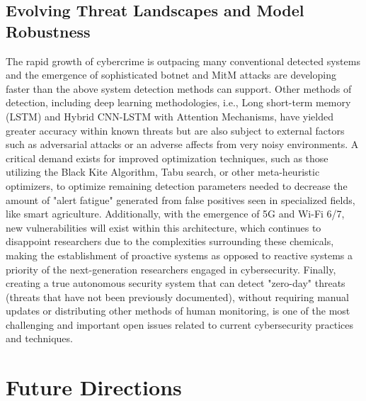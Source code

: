 \documentclass[12pt]{article}
\begin{document}
\subsection{Evolving Threat Landscapes and Model Robustness}
The rapid growth of cybercrime is outpacing many conventional detected systems and the emergence of sophisticated botnet and MitM attacks are developing faster than the above system detection methods can support. Other methods of detection, including deep learning methodologies, i.e., Long short-term memory (LSTM) and Hybrid CNN-LSTM with Attention Mechanisms, have yielded greater accuracy within known threats but are also subject to external factors such as adversarial attacks or an adverse affects from very noisy environments. A critical demand exists for improved optimization techniques, such as those utilizing the Black Kite Algorithm, Tabu search, or other meta-heuristic optimizers, to optimize remaining detection parameters needed to decrease the amount of "alert fatigue" generated from false positives seen in specialized fields, like smart agriculture. Additionally, with the emergence of 5G and Wi-Fi 6/7, new vulnerabilities will exist within this architecture, which continues to disappoint researchers due to the complexities surrounding these chemicals, making the establishment of proactive systems as opposed to reactive systems a priority of the next-generation researchers engaged in cybersecurity. Finally, creating a true autonomous security system that can detect "zero-day" threats (threats that have not been previously documented), without requiring manual updates or distributing other methods of human monitoring, is one of the most challenging and important open issues related to current cybersecurity practices and techniques.

	\section{Future Directions}
\end{document}
